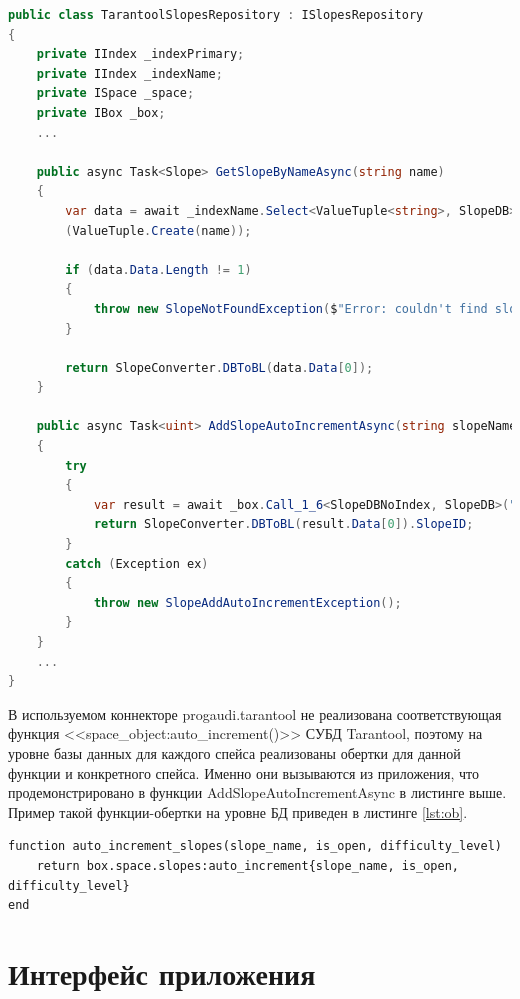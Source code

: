 \captionsetup{justification=centering,singlelinecheck=off}
\begin{lstlisting}[label=lst:slopes_rep, caption=Часть реализации репозитория для доступа к данным спейса slopes из БД, language=csharp]
public class TarantoolSlopesRepository : ISlopesRepository
{
	private IIndex _indexPrimary;
	private IIndex _indexName;
	private ISpace _space;
	private IBox _box;
	...
	
	public async Task<Slope> GetSlopeByNameAsync(string name)
	{
		var data = await _indexName.Select<ValueTuple<string>, SlopeDB>
		(ValueTuple.Create(name));
		
		if (data.Data.Length != 1)
		{
			throw new SlopeNotFoundException($"Error: couldn't find slope with name={name}");
		}
		
		return SlopeConverter.DBToBL(data.Data[0]);
	}
	
	public async Task<uint> AddSlopeAutoIncrementAsync(string slopeName, bool isOpen, uint difficultyLevel)
	{
		try
		{
			var result = await _box.Call_1_6<SlopeDBNoIndex, SlopeDB>("auto_increment_slopes", (new SlopeDBNoIndex(slopeName, isOpen, difficultyLevel)));
			return SlopeConverter.DBToBL(result.Data[0]).SlopeID;
		}
		catch (Exception ex)
		{
			throw new SlopeAddAutoIncrementException();
		}
	}
	...
}
\end{lstlisting}

В используемом коннекторе progaudi.tarantool не реализована соответствующая функция <<space\_object:auto\_increment()>> СУБД Tarantool, поэтому на уровне базы данных для каждого спейса реализованы обертки для данной функции и конкретного спейса. Именно они вызываются из приложения, что продемонстрировано в функции AddSlopeAutoIncrementAsync в листинге выше. Пример такой функции-обертки на уровне БД приведен в листинге \ref{lst:ob}.

\captionsetup{justification=centering,singlelinecheck=off}
\begin{lstlisting}[label=lst:ob, caption=Обертка для функции <<space\_object:auto\_increment()>> и спейса slopes, style=myLuastyle]
function auto_increment_slopes(slope_name, is_open, difficulty_level)
	return box.space.slopes:auto_increment{slope_name, is_open, difficulty_level}
end

\end{lstlisting}

\section{Интерфейс приложения}


